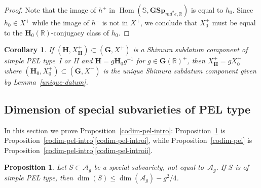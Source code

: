 \documentclass[11pt]{article}
\numberwithin{equation}{section}
\newcommand{\bR}{\mathbb{R}}
\newcommand{\Ag}{\mathcal{A}_g}
\newcommand{\gG}{\mathbf{G}}
\newcommand{\gGSp}{\mathbf{GSp}}
\newcommand{\gH}{\mathbf{H}}
\DeclareMathOperator{\Hom}{Hom}
\newtheorem{proposition}[lemma]{Proposition}
\newtheorem{corollary}[lemma]{Corollary}
\begin{document}
\begin{proof}
Note that the image of $h^+$ in $\Hom(\mathbb{S},\gGSp_{md^2e,\bR})$ is equal to $h_0$.
Since $h_0 \in X^+$ while the image of $h^-$ is not in $X^+$, we conclude that $X_0^+$ must be equal to the $\gH_0(\bR)$-conjugacy class of $h_0$.
\end{proof}

\begin{corollary} \label{conj-class-datum}
If $(\gH, X_\gH^+) \subset (\gG, X^+)$ is a Shimura subdatum component of simple PEL type~I or II and $\gH = g\gH_0 g^{-1}$ for $g \in \gG(\bR)^+$, then $X_\gH^+ = gX_0^+$ where $(\gH_0, X_0^+) \subset (\gG, X^+)$ is the unique Shimura subdatum component given by Lemma~\ref{unique-datum}.
\end{corollary}

\subsection{Dimension of special subvarieties of PEL type}\label{sec:dims}

In this section we prove Proposition~\ref{codim-pel-intro}: Proposition~\ref{codim-pel-simple} is Proposition~\ref{codim-pel-intro}\eqref{codim-pel-introi}, while Proposition~\ref{codim-pel} is Proposition~\ref{codim-pel-intro}\eqref{codim-pel-introii}.

\begin{proposition}\label{codim-pel-simple}
Let $S \subset \Ag$ be a special subvariety, not equal to~$\Ag$.
If $S$ is of simple PEL type, then $\dim(S) \leq \dim(\Ag) - g^2/4$.
\end{proposition}
\end{document}
